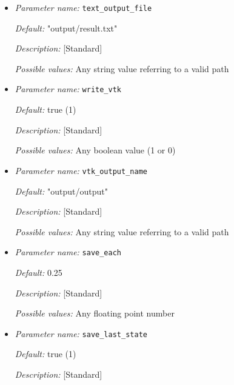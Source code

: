 \begin{itemize}
\item {\it Parameter name:} {\tt text\_output\_file}
\label{parameters:text_output_file}


{\it Default:} "output/result.txt"

{\it Description:} [Standard] 

{\it Possible values:} Any string value referring to a valid path


\item {\it Parameter name:} {\tt write\_vtk}
\label{parameters:write_vtk}


{\it Default:} true (1)

{\it Description:} [Standard] 

{\it Possible values:} Any boolean value (1 or 0)


\item {\it Parameter name:} {\tt vtk\_output\_name}
\label{parameters:vtk_output_name}


{\it Default:} "output/output"

{\it Description:} [Standard] 

{\it Possible values:} Any string value referring to a valid path


\item {\it Parameter name:} {\tt save\_each}
\label{parameters:save_each}


{\it Default:} 0.25

{\it Description:} [Standard] 

{\it Possible values:} Any floating point number


\item {\it Parameter name:} {\tt save\_last\_state}
\label{parameters:save_last_state}


{\it Default:} true (1)

{\it Description:} [Standard] 


\end{itemize}
